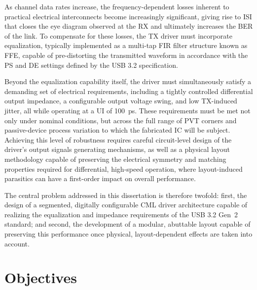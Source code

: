 As channel data rates increase, the frequency-dependent losses inherent to practical electrical interconnects become increasingly significant, giving rise to \ac{ISI} that closes the eye diagram observed at the \ac{RX} and ultimately increases the \ac{BER} of the link. To compensate for these losses, the \ac{TX} driver must incorporate equalization, typically implemented as a multi-tap \ac{FIR} filter structure known as \ac{FFE}, capable of pre-distorting the transmitted waveform in accordance with the \ac{PS} and \ac{DE} settings defined by the \ac{USB} 3.2 specification.

Beyond the equalization capability itself, the driver must simultaneously satisfy a demanding set of electrical requirements, including a tightly controlled differential output impedance, a configurable output voltage swing, and low \ac{TX}-induced jitter, all while operating at a \ac{UI} of \SI{100}{\pico\second}. These requirements must be met not only under nominal conditions, but across the full range of \ac{PVT} corners and passive-device process variation to which the fabricated \ac{IC} will be subject. %
Achieving this level of robustness requires careful circuit-level design of the driver's output signals generating mechanisms, as well as a physical layout methodology capable of preserving the electrical symmetry and matching properties required for differential, high-speed operation, where layout-induced parasitics can have a first-order impact on overall performance.

The central problem addressed in this dissertation is therefore twofold: first, the design of a segmented, digitally configurable \ac{CML} driver architecture capable of realizing the equalization and impedance requirements of the \ac{USB} 3.2 Gen~2 standard; and second, the development of a modular, abuttable layout capable of preserving this performance once physical, layout-dependent effects are taken into account.

\section{Objectives}

